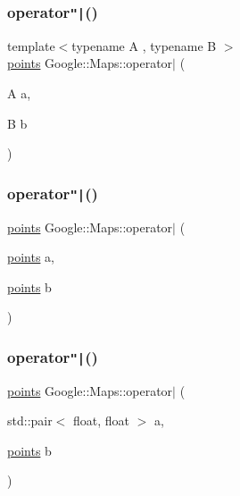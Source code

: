 \subsubsection{\texorpdfstring{operator\texttt{"|}()}{operator|()}\hspace{0.1cm}{\footnotesize\ttfamily [1/5]}}
{\footnotesize\ttfamily template$<$typename A , typename B $>$ \\
\hyperlink{a00063}{points} Google\+::\+Maps\+::operator$\vert$ (\begin{DoxyParamCaption}\item[{A}]{a,  }\item[{B}]{b }\end{DoxyParamCaption})}

\mbox{\label{a00039_a8345b75d81df9d421a75fc902fe170b2}} 
\subsubsection{\texorpdfstring{operator\texttt{"|}()}{operator|()}\hspace{0.1cm}{\footnotesize\ttfamily [2/5]}}
{\footnotesize\ttfamily \hyperlink{a00063}{points} Google\+::\+Maps\+::operator$\vert$ (\begin{DoxyParamCaption}\item[{\hyperlink{a00063}{points}}]{a,  }\item[{\hyperlink{a00063}{points}}]{b }\end{DoxyParamCaption})}

\mbox{\label{a00039_a6388de3be1005526c74c57e5121dca04}} 
\subsubsection{\texorpdfstring{operator\texttt{"|}()}{operator|()}\hspace{0.1cm}{\footnotesize\ttfamily [3/5]}}
{\footnotesize\ttfamily \hyperlink{a00063}{points} Google\+::\+Maps\+::operator$\vert$ (\begin{DoxyParamCaption}\item[{std\+::pair$<$ float, float $>$}]{a,  }\item[{\hyperlink{a00063}{points}}]{b }\end{DoxyParamCaption})}

